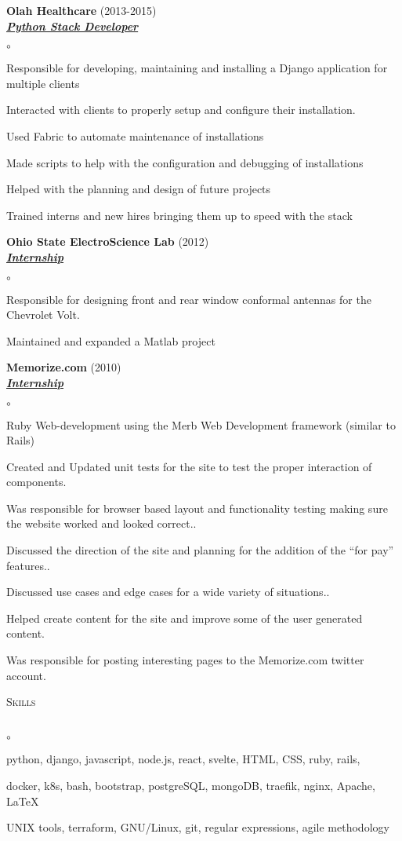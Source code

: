 \documentclass{article}
\newcommand{\lineunder}{\vspace*{-8pt} \\ \hspace*{-18pt} \hrulefill{} \\}
\newcommand{\header}[1]{{\hspace*{-15pt}\vspace*{6pt} \textsc{#1}} \vspace*{-6pt} \lineunder}
\newcommand{\employer}[3]{{ \textbf{#1} (#2)\\ \underline{\textbf{\emph{#3}}}\\  }}
\newenvironment{achievements}{\begin{list}{$\circ$}{\topsep 0pt \itemsep -2pt}}{\vspace*{4pt}\end{list}}
\begin{document}
\employer{Olah Healthcare}{2013-2015}{Python Stack Developer}
	\begin{achievements}
	\item Responsible for developing, maintaining and installing a Django application for multiple clients
	\item Interacted with clients to properly setup and configure their installation.
	\item Used Fabric to automate maintenance of installations
	\item Made scripts to help with the configuration and debugging of
	installations
	\item Helped with the planning and design of future projects
	\item Trained interns and new hires bringing them up to speed with
	the stack
	\end{achievements}

\employer{Ohio State ElectroScience Lab}{2012}{Internship}
	\begin{achievements}
	\item Responsible for designing front and rear window conformal antennas for the Chevrolet Volt.
	\item Maintained and expanded a Matlab project
	\end{achievements}

\employer{Memorize.com}{2010}{Internship}
	\begin{achievements}
	\item Ruby Web-development using the Merb Web Development framework
(similar to Rails)
	\item Created and Updated unit tests for the site to test the proper
interaction of components.
	\item Was responsible for browser based layout and functionality testing
making sure the website worked and looked correct..
	\item Discussed the direction of the site and planning
for the addition of the ``for pay'' features..
	\item Discussed use cases and edge cases for a wide variety of
situations..
	\item Helped create content for the site and improve some of the
	user generated content.
	\item Was responsible for posting interesting pages to the Memorize.com twitter
	account.
	\end{achievements}

\header{Skills}
\begin{achievements}
	\item python, django, javascript, node.js, react, svelte, HTML, CSS, ruby, rails,
	\item docker, k8s, bash, bootstrap, postgreSQL, mongoDB, traefik, nginx, Apache, \LaTeX{}
	\item UNIX tools, terraform, GNU/Linux, git, regular expressions, agile methodology
\end{achievements}
\end{document}
